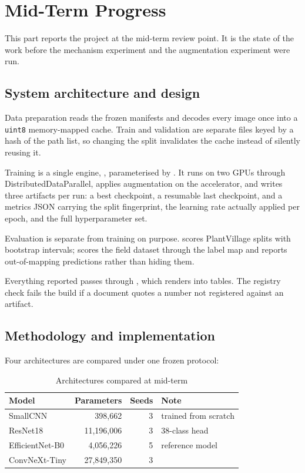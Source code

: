 
\chapter{Mid-Term Progress}

This part reports the project at the mid-term review point. It is the state of the
work before the mechanism experiment and the augmentation experiment were run.

\section{System architecture and design}

Data preparation reads the frozen manifests and decodes every image once into a
\texttt{uint8} memory-mapped cache. Train and validation are separate files keyed by
a hash of the path list, so changing the split invalidates the cache instead of
silently reusing it.

Training is a single engine, , parameterised by
. It runs on two GPUs through
DistributedDataParallel, applies augmentation on the accelerator, and writes three
artifacts per run: a best checkpoint, a resumable last checkpoint, and a metrics JSON
carrying the split fingerprint, the learning rate actually applied per epoch, and the
full hyperparameter set.

Evaluation is separate from training on purpose. 
scores PlantVillage splits with bootstrap intervals; 
scores the field dataset through the label map and reports out-of-mapping
predictions rather than hiding them.

Everything reported passes through , which
 renders into tables. The registry check fails the
build if a document quotes a number not registered against an artifact.

\section{Methodology and implementation}

Four architectures are compared under one frozen protocol:

\begin{table}[H]
\centering
\caption{Architectures compared at mid-term}
\label{tab:arch-mid}
\tabfont
\begin{tabularx}{\textwidth}{@{}lrrY@{}}
\toprule
\textbf{Model} & \textbf{Parameters} & \textbf{Seeds} & \textbf{Note} \\
\midrule
SmallCNN & 398,662 & 3 & trained from scratch \\
ResNet18 & 11,196,006 & 3 & 38-class head \\
EfficientNet-B0 & 4,056,226 & 5 & reference model \\
ConvNeXt-Tiny & 27,849,350 & 3 & \\
\bottomrule
\end{tabularx}
\end{table}

